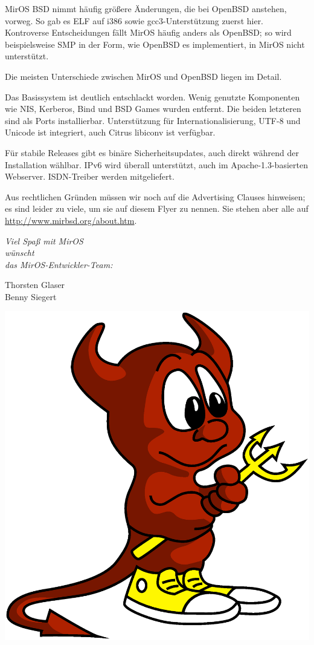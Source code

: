 \documentclass[a4paper,landscape,11pt,notumble]{leaflet}
\newlength\oldfbs
\newcommand\graybox{\setlength\oldfbs\fboxsep%
 \setlength\fboxsep{0pt}%
 \noindent\fbox{\color{LIGHTGRAY}\rule{\columnwidth}{1ex}}%
 \setlength\fboxsep\oldfbs}
\begin{document}
MirOS BSD nimmt häufig größere Änderungen, die bei OpenBSD anstehen, vorweg. So gab es ELF auf i386 sowie gcc3-Unterstützung zuerst hier. Kontroverse Entscheidungen fällt MirOS häufig anders als OpenBSD; so wird beispielsweise SMP in der Form, wie OpenBSD es implementiert, in MirOS nicht unterstützt.

Die meisten Unterschiede zwischen MirOS und OpenBSD liegen im Detail.

Das Basissystem ist deutlich entschlackt worden. Wenig genutzte Komponenten wie NIS, Kerberos, Bind und BSD Games wurden entfernt. Die beiden letzteren sind als Ports installierbar. Unterstützung für Internationalisierung, UTF-8 und Unicode ist integriert, auch Citrus libiconv ist verfügbar.

Für stabile Releases gibt es binäre Sicherheitsupdates, auch direkt während der Installation wählbar.
IPv6 wird überall unterstützt, auch im Apache-1.3-basierten Webserver. ISDN-Treiber werden mitgeliefert.

Aus rechtlichen Gründen müssen wir noch auf die Advertising Clauses hinweisen; es sind leider zu viele, um sie auf diesem Flyer zu nennen. Sie stehen aber alle
auf \url{http://www.mirbsd.org/about.htm}.

\newpage


\graybox\par
\begin{center}
\vspace{3ex}
{\Large\itshape
Viel Spaß mit MirOS\\
wünscht\\
das MirOS-Entwickler-Team:\par\medskip
\color{darkred}%
Thorsten Glaser\\
Benny Siegert\par
}

\vfill

\includegraphics[width=0.75\columnwidth]{img/bsdaemon}

\vfill%
\end{center}%
\end{document}
